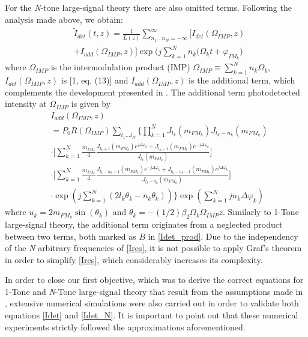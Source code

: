 \documentclass[journal]{IEEEtran}
\begin{document}
For the \emph{N}-tone large-signal theory there are also omitted terms. Following the analysis made above, we obtain:
\begin{align} \label{Idet_N} \nonumber
& \tilde{I}_{det}(t,z) = \frac{1}{L(z)}\sum_{n_1 \ldots n_N = -\infty}^{\infty} \bigg[I_{det}(\Omega_{IMP},z) \\
& + I_{add}(\Omega_{IMP},z)\bigg]\exp\bigg(j\sum_{k = 1}^N n_k(\Omega_kt + \varphi_{IM_k}\bigg)
\end{align}
where $\Omega_{IMP}$ is the intermodulation product (IMP) $\Omega_{IMP} \equiv \sum_{k = 1}^N n_k\Omega_k$, $I_{det}(\Omega_{IMP},z)$ is [1, eq. (13)] and $I_{add}(\Omega_{IMP},z)$ is the additional term, which complements the development presented in \cite{eva}. The additional term photodetected intensity at $\Omega_{IMP}$ is given by
\begin{align} \nonumber \label{Ires}
& I_{add}(\Omega_{IMP},z) \\ \nonumber
& = P_0R(\Omega_{IMP})\displaystyle\sum_{l_1 \ldots l_N}\bigg\lbrace\prod_{k = 1}^NJ_{l_k}(m_{FM_k})J_{l_k - n_k}(m_{FM_k}) \\ \nonumber
& \cdot\bigg[\sum_{k = 1}^N\textstyle\frac{m_{IM_k}}{4}\frac{J_{l_k+1}(m_{FM_k})e^{j\Delta\varphi_k} + J_{l_k-1}(m_{FM_k})e^{-j\Delta\varphi_k}}{J_{l_k}(m_{FM_k})}\bigg] \\ \nonumber
& \cdot\bigg[\sum_{k = 1}^N\textstyle\frac{m_{IM_k}}{4}\frac{J_{l_k-n_k+1}(m_{FM_k})e^{-j\Delta\varphi_k} + J_{l_k-n_k-1}(m_{FM_k})e^{j\Delta\varphi_k}}{J_{l_k-n_k}(m_{FM_k})}\bigg] \\
& \cdot\exp(j\textstyle\sum_{k = 1}^N (2l_k\theta_k - n_k\theta_k))\bigg\rbrace\exp(\textstyle\sum_{k=1}^Njn_k\Delta\varphi_k)
\end{align}
where $u_k = 2m_{FM_k}\sin{(\theta_k)}$ and $\theta_k = -(1/2)\beta_2\Omega_k\Omega_{IMP}z$. Similarly to 1-Tone large-signal theory, the additional term originates from a neglected product between two terms, both marked as $B$ in \eqref{Idet_prod}. Due to the independency of the \emph{N} arbitrary frequencies of \eqref{Ires}, it is not possible to apply Graf’s theorem in order to simplify \eqref{Ires}, which considerably increases its complexity. 

In order to close our first objective, which was to derive the correct equations for 1-Tone and \emph{N}-Tone large-signal theory that result from the assumptions made in \cite{eva}, extensive numerical simulations were also carried out in order to validate both equations \eqref{Idet} and \eqref{Idet_N}. It is important to point out that these numerical experiments strictly followed the approximations aforementioned. 
\end{document}
